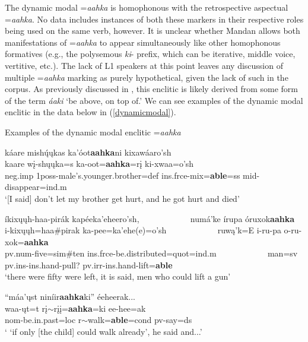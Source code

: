 The dynamic modal =\textit{aahka} is homophonous with the retrospective aspectual =\textit{aahka}. No data includes instances of both these markers in their respective roles being used on the same verb, however. It is unclear whether Mandan allows both manifestations of =\textit{aahka} to appear simultaneously like other homophonous formatives (e.g., the polysemous \textit{ki}- prefix, which can be iterative, middle voice, vertitive, etc.). The lack of L1 speakers at this point leaves any discussion of multiple =\textit{aahka} marking as purely hypothetical, given the lack of such in the corpus. As previously discussed in , this enclitic is likely derived from some form of the term \textit{áaki} `be above, on top of.' We can see examples of the dynamic modal enclitic in the data below in (\ref{dynamicmodal}).

\begin{exe}

\item\label{dynamicmodal} Examples of the dynamic modal enclitic =\textit{aahka}

	\begin{xlist}
	
	\item\label{dynamicmodal1}
	\glll káare mishų́ųkas ka'óot\textbf{aahka}ni kixawáaro'sh\\
	kaare wį-shųųka=s ka-oot=\textbf{aahka}=rį ki-xwaa=o'sh\\
	neg.imp 1poss-\textnormal{male's.younger.brother}=def ins.frce-\textnormal{mix}=\textbf{able}=ss mid-\textnormal{disappear}=ind.m\\
	\glt `[I said] don't let my brother get hurt, and he got hurt and died' \citep[63]{hollow1973a}

	\item\label{dynamicmodal2}
	\glll íkixųųh-haa-pirák kapéeka'eheero'sh, ~ ~ ~ ~ ~ ~ ~ numá'ke írupa óruxok\textbf{aahka}\\
	i-kixųųh=haa\#pirak ka-pee=ka'ehe(e)=o'sh ~ ~ ~ ~ ~ ~ ~ ruwą'k=E i-ru-pa o-ru-xok=\textbf{aahka}\\
	pv.num-\textnormal{five}=sim\#\textnormal{ten} ins.frce-\textnormal{be.distributed}=quot=ind.m ~ ~ ~ ~ ~ ~ ~ \textnormal{man}=sv pv.ins-ins.hand-\textnormal{pull?} pv.irr-ins.hand-\textnormal{lift}=\textbf{able}\\
	\glt `there were fifty were left, it is said, men who could lift a gun' \citep[47]{hollow1973a}

	\item\label{dynamicmodal3}
	\glll ``máa'ųst niníir\textbf{aahka}ki'' éeheerak...\\
	waa-ųt=t rį$\sim$rįį=\textbf{aahka}=ki ee-hee=ak\\
	nom-\textnormal{be.in.past}=loc r$\sim$\textnormal{walk}=\textbf{able}=cond pv-\textnormal{say}=ds\\
	\glt ` `if only [the child] could walk already', he said and...' \citep[160]{hollow1973a}

	\end{xlist}

\end{exe} 

